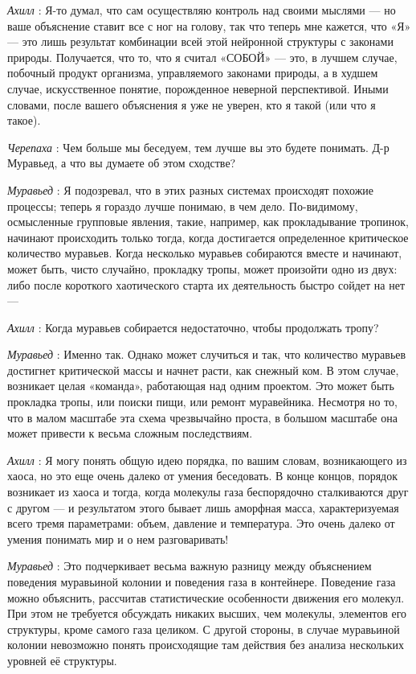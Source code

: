 \documentclass[../main.tex]{subfiles}
\begin{document}
\begin{dialogue}
\emph{Ахилл} : Я-то думал, что сам осуществляю контроль над своими мыслями --- но ваше объяснение ставит все с ног на голову, так что теперь мне кажется, что «Я» --- это лишь результат комбинации всей этой нейронной структуры с законами природы. Получается, что то, что я считал «СОБОЙ» --- это, в лучшем случае, побочный продукт организма, управляемого законами природы, а в худшем случае, искусственное понятие, порожденное неверной перспективой. Иными словами, после вашего объяснения я уже не уверен, кто я такой (или что я такое).

\emph{Черепаха} : Чем больше мы беседуем, тем лучше вы это будете понимать. Д-р Муравьед, а что вы думаете об этом сходстве?

\emph{Муравьед} : Я подозревал, что в этих разных системах происходят похожие процессы; теперь я гораздо лучше понимаю, в чем дело. По-видимому, осмысленные групповые явления, такие, например, как прокладывание тропинок, начинают происходить только тогда, когда достигается определенное критическое количество муравьев. Когда несколько муравьев собираются вместе и начинают, может быть, чисто случайно, прокладку тропы, может произойти одно из двух: либо после короткого хаотического старта их деятельность быстро сойдет на нет ---

\emph{Ахилл} : Когда муравьев собирается недостаточно, чтобы продолжать тропу?

\emph{Муравьед} : Именно так. Однако может случиться и так, что количество муравьев достигнет критической массы и начнет расти, как снежный ком. В этом случае, возникает целая «команда», работающая над одним проектом. Это может быть прокладка тропы, или поиски пищи, или ремонт муравейника. Несмотря но то, что в малом масштабе эта схема чрезвычайно проста, в большом масштабе она может привести к весьма сложным последствиям.

\emph{Ахилл} : Я могу понять общую идею порядка, по вашим словам, возникающего из хаоса, но это еще очень далеко от умения беседовать. В конце концов, порядок возникает из хаоса и тогда, когда молекулы газа беспорядочно сталкиваются друг с другом --- и результатом этого бывает лишь аморфная масса, характеризуемая всего тремя параметрами: объем, давление и температура. Это очень далеко от умения понимать мир и о нем разговаривать!

\emph{Муравьед} : Это подчеркивает весьма важную разницу между объяснением поведения муравьиной колонии и поведения газа в контейнере. Поведение газа можно объяснить, рассчитав статистические особенности движения его молекул. При этом не требуется обсуждать никаких высших, чем молекулы, элементов его структуры, кроме самого газа целиком. С другой стороны, в случае муравьиной колонии невозможно понять происходящие там действия без анализа нескольких уровней её структуры.


\end{dialogue}
\end{document}
